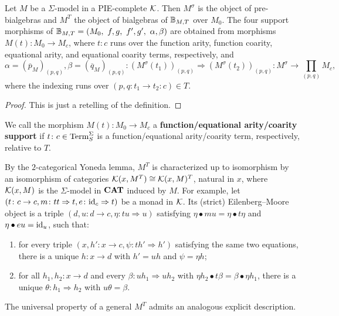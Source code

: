 \begin{proposition}\label{prp:bialgebraic_datum}
    Let $M$ be a $\Sigma$-model in a PIE-complete $\mathcal{K}$. Then $M^\sigma$ is the object of pre-bialgebras and $M^T$ the object of bialgebras of $\mathbb{B}_{M,T}$ over $M_0$. The four support morphisms of $\mathbb{B}_{M,T} = (M_0,\ f,g,\ f',g',\ \alpha,\beta)$ are obtained from morphisms $M(t)\colon M_0\to M_c$, where $t\colon c$ runs over the function arity, function coarity, equational arity, and equational coarity terms, respectively, and 
    $$
    \alpha = (\overline{p}_M)_{(p,q)}, \beta = (\overline{q}_M)_{(p,q)}\colon (M^\sigma(t_1))_{(p,q)}\Rightarrow (M^\sigma(t_2))_{(p,q)}\colon M^\sigma\to \prod_{(p,q)}M_c,
    $$
    where the indexing runs over $(p,q\colon t_1\to t_2\colon c)\in T$. 
\end{proposition}
\begin{proof}
    This is just a retelling of the definition.
\end{proof}

\begin{definition}\label{def:supportsOfTerms}
We call the morphism $M(t)\colon M_0\to M_c$ a \textbf{function/equational arity/coarity support} if $t\colon c\in \mathrm{Term}_S^\Sigma$ is a function/equational arity/coarity term, respectively, relative to $T$.
\end{definition}

\begin{remark}\label{rem:UPEM}
    By the $2$-categorical Yoneda lemma, $M^T$ is characterized up to isomorphism by an isomorphism of categories $\mathcal{K}(x,M^T)\cong\mathcal{K}(x,M)^T$, natural in $x$, where $\mathcal{K}(x,M)$ is the $\Sigma$-model in $\mathbf{CAT}$ induced by $M$. For example, let $(t\colon c\to c,m\colon tt\Rightarrow t,e\colon \mathrm{id}_c\Rightarrow t)$ be a monad in $\mathcal{K}$. Its (strict) Eilenberg--Moore object \cite{STREET1972149} is a triple $(d,u\colon d\to c,\eta\colon tu\Rightarrow u)$ satisfying $\eta\bullet mu=\eta\bullet t\eta$ and $\eta\bullet eu=\mathrm{id}_u$, such that:
    \begin{enumerate}
        \item for every triple $(x,h'\colon x\to c,\psi\colon th'\Rightarrow h')$ satisfying the same two equations, there is a unique $h\colon x\to d$ with $h' = uh$ and $\psi = \eta h$;
        \item for all $h_1,h_2\colon x\to d$ and every $\beta\colon uh_1\Rightarrow uh_2$ with $\eta h_2\bullet t\beta=\beta\bullet\eta h_1$, there is a unique $\theta\colon h_1\Rightarrow h_2$ with $u\theta=\beta$.
    \end{enumerate}
    The universal property of a general $M^T$ admits an analogous explicit description.
\end{remark}




